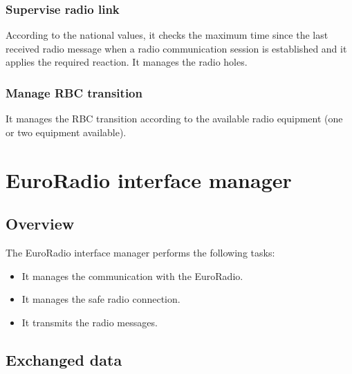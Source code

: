 \documentclass[nocc]{template/openetcs_report}
\begin{document}
\subsection{Supervise radio link}
According to the national values, it checks the maximum time since the last received radio message when a radio communication session is established and it applies the required reaction. It manages the radio holes.

\subsection{Manage RBC transition}
It manages the RBC transition according to the available radio equipment (one or two equipment available).

\chapter{EuroRadio interface manager}
\section{Overview}
The EuroRadio interface manager performs the following tasks:
\begin{itemize}
\item	It manages the communication with the EuroRadio.
\item	It manages the safe radio connection.
\item	It transmits the radio messages.
\end{itemize}
\section{Exchanged data}
\end{document}
